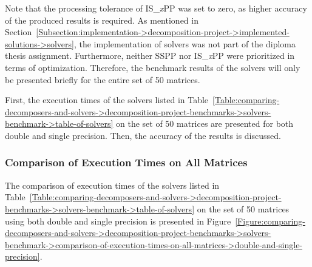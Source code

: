 Note that the processing tolerance of IS\_\textit{x}PP was set to zero, as higher accuracy of the produced results is required. As mentioned in Section~\ref{Subsection:implementation->decomposition-project->implemented-solutions->solvers}, the implementation of solvers was not part of the diploma thesis assignment. Furthermore, neither SSPP nor IS\_\textit{x}PP were prioritized in terms of optimization. Therefore, the benchmark results of the solvers will only be presented briefly for the entire set of 50 matrices.

First, the execution times of the solvers listed in Table~\ref{Table:comparing-decomposers-and-solvers->decomposition-project-benchmarks->solvers-benchmark->table-of-solvers} on the set of 50 matrices are presented for both double and single precision. Then, the accuracy of the results is discussed.


\subsubsection{Comparison of Execution Times on All Matrices}
The comparison of execution times of the solvers listed in Table~\ref{Table:comparing-decomposers-and-solvers->decomposition-project-benchmarks->solvers-benchmark->table-of-solvers} on the set of 50 matrices using both double and single precision is presented in Figure~\ref{Figure:comparing-decomposers-and-solvers->decomposition-project-benchmarks->solvers-benchmark->comparison-of-execution-times-on-all-matrices->double-and-single-precision}.

